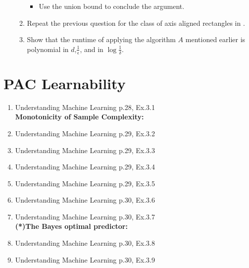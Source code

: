 \documentclass[12pt]{article}
\theoremstyle{definition}
\begin{document}
\begin{enumerate}
\begin{enumerate}
\begin{itemize}
			\item Use the union bound to conclude the argument.
		\end{itemize}	
		
		\item Repeat the previous question for the class of axis aligned rectangles in .
	
		\item Show that the runtime of applying the algorithm $A$ 
		mentioned earlier is polynomial in $d$,$\frac{1}{\epsilon}$, and in $\log{\frac{1}{\delta}}$.

\end{enumerate}
\end{enumerate} %




\section{PAC Learnability}
\begin{enumerate}
	\item Understanding Machine Learning p.28, Ex.3.1\\
	\textbf{Monotonicity of Sample Complexity:}
	
	\item Understanding Machine Learning p.29, Ex.3.2\\
	\item Understanding Machine Learning p.29, Ex.3.3\\
	\item Understanding Machine Learning p.29, Ex.3.4\\
	\item Understanding Machine Learning p.29, Ex.3.5\\
	\item Understanding Machine Learning p.30, Ex.3.6\\
	\item Understanding Machine Learning p.30, Ex.3.7\\
	\textbf{(*)The Bayes optimal predictor:}
	\item Understanding Machine Learning p.30, Ex.3.8\\
	\item Understanding Machine Learning p.30, Ex.3.9\\
\end{enumerate}
\end{document}
